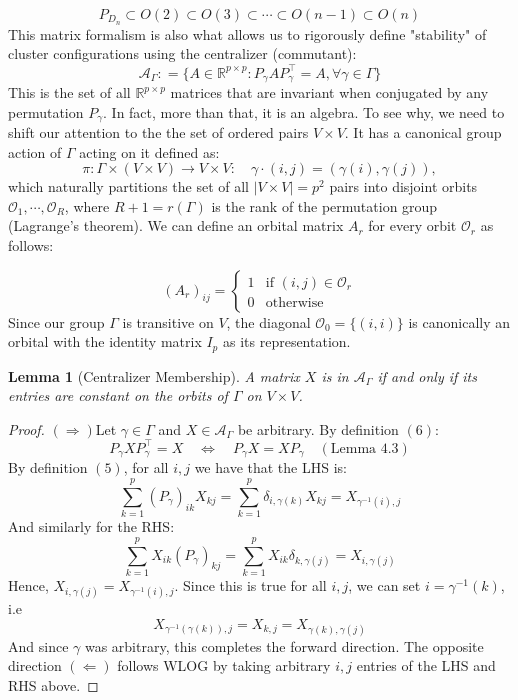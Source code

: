 \documentclass{article}
\theoremstyle{plain}
\newtheorem{lemma}{Lemma}[section]
\numberwithin{equation}{section}
\theoremstyle{definition}
\theoremstyle{remark}
\begin{document}
$$P_{D_n}\subset O(2)\subset O(3)\subset\cdots \subset O(n-1)\subset O(n)$$
This matrix formalism is also what allows us to rigorously define "stability" of cluster configurations using the centralizer (commutant): 
\begin{equation}
\mathcal{A}_\Gamma : = \{A\in \mathbb{R}^{p\times p}: P_\gamma A P_\gamma^\top  = A, \forall \gamma\in \Gamma\}
\end{equation}
This is the set of all $\mathbb{R}^{p\times p}$ matrices that are invariant when conjugated by any permutation $P_\gamma$. In fact, more than that, it is an algebra. To see why, we need to shift our attention to the the set of ordered pairs $V\times V$. It has a canonical group action of $\Gamma$ acting on it defined as:
$$\pi: \Gamma\times (V\times V)\rightarrow V\times V: \quad \gamma \cdot (i, j) = (\gamma(i), \gamma(j)),$$
which naturally partitions the set of all $|V\times V| = p^2$ pairs into disjoint orbits $\mathcal{O}_1, \cdots, \mathcal{O}_R$, where $R+1=r(\Gamma)$ is the rank of the permutation group (Lagrange's theorem). We can define an orbital matrix $A_r$ for every orbit $\mathcal{O}_r$ as follows:

\begin{equation}
    (A_r)_{ij} = \left\{\begin{matrix}1 & \text{if }(i, j)\in \mathcal{O}_r\\0& \text{otherwise}\end{matrix}\right.
\end{equation}
Since our group $\Gamma$ is transitive on $V$, the diagonal $\mathcal{O}_0=\{(i,i)\}$ is canonically an orbital  with the identity matrix $I_p$ as its representation. 
\begin{lemmaproofbox}
\begin{lemma}[Centralizer Membership]  A matrix $X$ is in $\mathcal{A}_\Gamma$ if and only if its entries are constant on the orbits of $\Gamma$ on $V\times V$. 
\end{lemma}\label{lemma:A.2}
\begin{proof} 
$(\Rightarrow)$Let $\gamma\in \Gamma$ and $X\in \mathcal{A}_\Gamma$ be arbitrary. By definition $(6)$:   $$P_\gamma X P_\gamma^\top =X\quad \Leftrightarrow\quad  P_\gamma X = XP_\gamma \quad(\text{Lemma }4.3)$$
By definition $(5)$, for all $i, j$ we have that the LHS is:
$$ \sum_{k=1}^p (P_\gamma)_{ik}X_{kj} = \sum_{k=1}^p\delta_{i,\gamma(k)} X_{kj}= X_{\gamma^{-1}(i), j}$$
And similarly for the RHS:
$$\sum_{k=1}^pX_{ik} (P_\gamma)_{kj} = \sum_{k=1}^p X_{ik} \delta_{k, \gamma(j)} = X_{i, \gamma(j)}$$
Hence, $X_{i, \gamma(j)} = X_{\gamma^{-1}(i), j}$. Since this is true for all $i,j$, we can set $i = \gamma^{-1}(k)$, i.e $$X_{\gamma^{-1}(\gamma(k)), j} = X_{k, j} = X_{\gamma(k), \gamma(j)}$$
And since $\gamma$ was arbitrary, this completes the forward direction. The opposite direction $(\Leftarrow)$ follows WLOG by taking arbitrary $i,j$ entries of the LHS and RHS above. 
\end{proof}
\end{lemmaproofbox}
\end{document}
